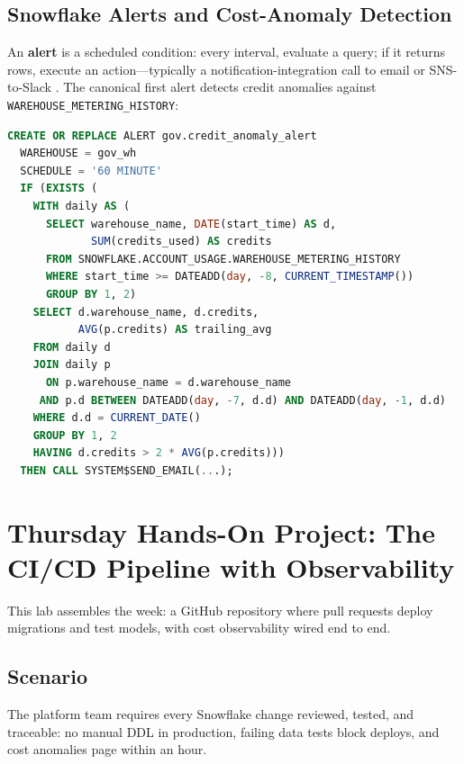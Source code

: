 \subsection{Snowflake Alerts and Cost-Anomaly Detection}
An \textbf{alert} is a scheduled condition: every interval, evaluate a query; if it returns rows, execute an action---typically a notification-integration call to email or SNS-to-Slack \cite{snowflakeAlertsDocs}. The canonical first alert detects credit anomalies against \texttt{WAREHOUSE\_METERING\_HISTORY}:

\begin{lstlisting}[language=SQL, caption={Cost-anomaly alert: 2x deviation from trailing 7-day average}]
CREATE OR REPLACE ALERT gov.credit_anomaly_alert
  WAREHOUSE = gov_wh
  SCHEDULE = '60 MINUTE'
  IF (EXISTS (
    WITH daily AS (
      SELECT warehouse_name, DATE(start_time) AS d,
             SUM(credits_used) AS credits
      FROM SNOWFLAKE.ACCOUNT_USAGE.WAREHOUSE_METERING_HISTORY
      WHERE start_time >= DATEADD(day, -8, CURRENT_TIMESTAMP())
      GROUP BY 1, 2)
    SELECT d.warehouse_name, d.credits,
           AVG(p.credits) AS trailing_avg
    FROM daily d
    JOIN daily p
      ON p.warehouse_name = d.warehouse_name
     AND p.d BETWEEN DATEADD(day, -7, d.d) AND DATEADD(day, -1, d.d)
    WHERE d.d = CURRENT_DATE()
    GROUP BY 1, 2
    HAVING d.credits > 2 * AVG(p.credits)))
  THEN CALL SYSTEM$SEND_EMAIL(...);
\end{lstlisting}

\section{Thursday Hands-On Project: The CI/CD Pipeline with Observability}
This lab assembles the week: a GitHub repository where pull requests deploy migrations and test models, with cost observability wired end to end.

\subsection*{Scenario}
The platform team requires every Snowflake change reviewed, tested, and traceable: no manual DDL in production, failing data tests block deploys, and cost anomalies page within an hour.

